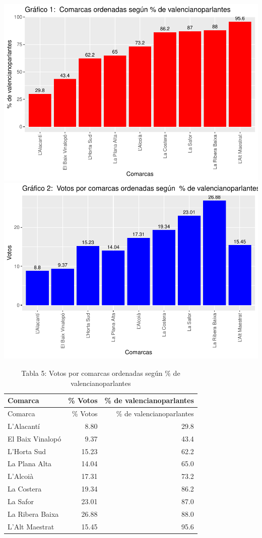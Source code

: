 \documentclass[
]{article}
\begin{document}
\includegraphics{votovalencianista-ea2023_page_files/figure-latex/ordenValencianoparlantes-1.pdf}
\includegraphics{votovalencianista-ea2023_page_files/figure-latex/ordenValencianoparlantes-2.pdf}

\begin{longtable}[]{@{}lrr@{}}
\caption{Tabla 5: Votos por comarcas ordenadas según \% de
valencianoparlantes}\tabularnewline
\toprule\noalign{}
Comarca & \% Votos & \% de valencianoparlantes \\
\midrule\noalign{}
\endfirsthead
\toprule\noalign{}
Comarca & \% Votos & \% de valencianoparlantes \\
\midrule\noalign{}
\endhead
\bottomrule\noalign{}
\endlastfoot
L'Alacantí & 8.80 & 29.8 \\
El Baix Vinalopó & 9.37 & 43.4 \\
L'Horta Sud & 15.23 & 62.2 \\
La Plana Alta & 14.04 & 65.0 \\
L'Alcoià & 17.31 & 73.2 \\
La Costera & 19.34 & 86.2 \\
La Safor & 23.01 & 87.0 \\
La Ribera Baixa & 26.88 & 88.0 \\
L'Alt Maestrat & 15.45 & 95.6 \\
\end{longtable}
\end{document}
